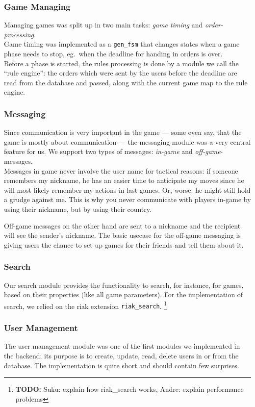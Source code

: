 \documentclass[11pt,a4paper]{report}
\newcommand{\todo}[1]{\footnote{{\color{red} {\bf TODO:} #1}}}
\begin{document}
\subsubsection{Game Managing}
Managing games was split up in two main tasks: {\em game timing\/} and
{\em order-processing}. \\
Game timing was implemented as a {\tt gen\_fsm} that changes states when a game
phase needs to stop, eg.\ when the deadline for handing in orders is over.\\
Before a phase is started, the rules processing is done by a module we call
the ``rule engine'': the orders which were sent by the users before the deadline
are read from the database and passed, along with the current game map to the
rule engine.
\subsubsection{Messaging}
Since communication is very important in the game --- some even say, that the
game is mostly about communication --- the messaging module was a very central
feature for us. We support two types of messages: {\em in-game\/} and
{\em off-game\/}-messages.\\
Messages in game never involve the user name for
tactical reasons: if someone remembers my nickname, he has an easier time to
anticipate my moves since he will most likely remember my actions in last games.
Or, worse: he might still hold a grudge against me. This is why you never
communicate with players in-game by using their nickname, but by using their
country.

Off-game messages on the other hand are sent to a nickname and the recipient
will see the sender's nickname. The basic usecase for the off-game messaging is
giving users the chance to set up games for their friends and tell them about
it.
\subsubsection{Search}
Our search module provides the functionality to search, for instance, for games,
based on their properties (like all game parameters). For the implementation of
search, we relied on the riak extension {\tt riak\_search}. \todo{Suku: explain how riak\_search works, Andre: explain performance problems}
\subsubsection{User Management}
The user management module was one of the first modules we implemented in the
backend; its purpose is to create, update, read, delete users in or from the
database. The implementation is quite short and should contain few surprises.
\end{document}
